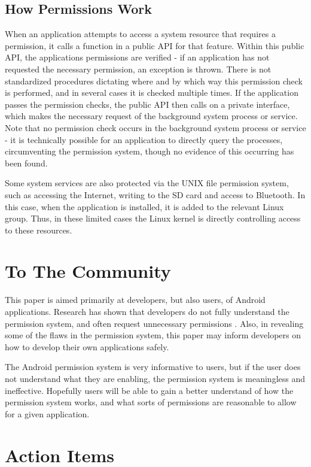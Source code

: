 \documentclass[12pt,pdftex]{article}
\begin{document}
\begin{doublespace}
\subsection{How Permissions Work}
When an application attempts to access a system resource that requires a permission, it calls a function in a public API for that feature.  Within this public API, the applications permissions are verified - if an application has not requested the necessary permission, an exception is thrown.  There is not standardized procedures dictating where and by which way this permission check is performed, and in several cases it is checked multiple times.  If the application passes the permission checks, the public API then calls on a private interface,  which makes the necessary request of the background system process or service.  Note that no permission check occurs in the background system process or service - it is technically possible for an application to directly query the processes, circumventing the permission system, though no evidence of this occurring has been found.  

Some system services are also protected via the UNIX file permission system, such as accessing the Internet, writing to the SD card and access to Bluetooth.  In this case, when the application is installed, it is added to the relevant Linux group.  Thus, in these limited cases the Linux kernel is directly controlling access to these resources. \cite{felt11}


\section{To The Community}
This paper is aimed primarily at developers, but also users, of Android applications.  Research has shown that developers do not fully understand the permission system, and often request unnecessary permissions \cite{felt11}.  Also, in revealing some of the flaws in the permission system, this paper may inform developers on how to develop their own applications safely.

The Android permission system is very informative to users, but if the user does not understand what they are enabling, the permission system is meaningless and ineffective.  Hopefully users will be able to gain a better understand of how the permission system works, and what sorts of permissions are reasonable to allow for a given application.

\section{Action Items}


\end{doublespace}
\end{document}

